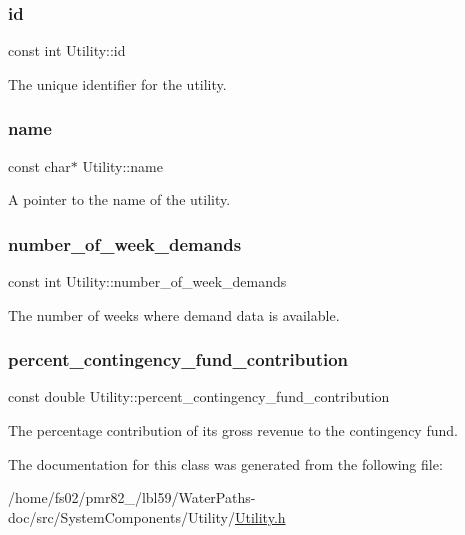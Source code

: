 \subsubsection{\texorpdfstring{id}{id}}
{\footnotesize\ttfamily const int Utility\+::id}



The unique identifier for the utility. 

\mbox{\label{classUtility_ad0ce5c179a7f5ceb46d4fcae08dbfb47}} 
\subsubsection{\texorpdfstring{name}{name}}
{\footnotesize\ttfamily const char$\ast$ Utility\+::name}



A pointer to the name of the utility. 

\mbox{\label{classUtility_a0548db3746582251082aa430db49dad0}} 
\subsubsection{\texorpdfstring{number\+\_\+of\+\_\+week\+\_\+demands}{number\_of\_week\_demands}}
{\footnotesize\ttfamily const int Utility\+::number\+\_\+of\+\_\+week\+\_\+demands}



The number of weeks where demand data is available. 

\mbox{\label{classUtility_a7b1a097ec188be8e7175d058b5e6596c}} 
\subsubsection{\texorpdfstring{percent\+\_\+contingency\+\_\+fund\+\_\+contribution}{percent\_contingency\_fund\_contribution}}
{\footnotesize\ttfamily const double Utility\+::percent\+\_\+contingency\+\_\+fund\+\_\+contribution}



The percentage contribution of its gross revenue to the contingency fund. 



The documentation for this class was generated from the following file\+:\begin{DoxyCompactItemize}
\item 
/home/fs02/pmr82\+\_/lbl59/\+Water\+Paths-\/doc/src/\+System\+Components/\+Utility/\mbox{\hyperlink{Utility_8h}{Utility.\+h}}\end{DoxyCompactItemize}
